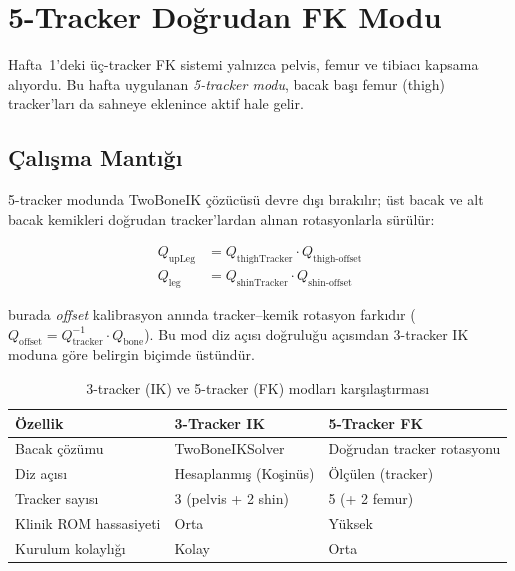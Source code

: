 \documentclass[11pt,a4paper]{article}
\begin{document}
\section{5-Tracker Do\u{g}rudan FK Modu}
\label{sec:fivtracker}

Hafta~1'deki \"u\c{c}-tracker FK sistemi yaln{\i}zca pelvis,
femur ve tibiac{\i} kapsama al{\i}yordu. Bu hafta uygulanan
\textit{5-tracker modu}, bacak ba\c{s}{\i} femur (thigh) tracker'lar{\i}
da sahneye eklenince aktif hale gelir.

\subsection{\c{C}al{\i}\c{s}ma Mant{\i}\u{g}{\i}}

5-tracker modunda TwoBoneIK \c{c}\"oz\"uc\"us\"u devre d{\i}\c{s}{\i}
b{\i}rak{\i}l{\i}r; \"ust bacak ve alt bacak kemikleri do\u{g}rudan
tracker'lardan al{\i}nan rotasyonlarla s\"ur\"ul\"ur:

\begin{align}
    Q_{\text{upLeg}} &= Q_{\text{thighTracker}} \cdot Q_{\text{thigh-offset}}
    \label{eq:fk5_upleg} \\
    Q_{\text{leg}}   &= Q_{\text{shinTracker}}  \cdot Q_{\text{shin-offset}}
    \label{eq:fk5_leg}
\end{align}

burada \textit{offset} kalibrasyon an{\i}nda tracker--kemik
rotasyon fark{\i}d{\i}r ($Q_{\text{offset}} = Q_{\text{tracker}}^{-1}
\cdot Q_{\text{bone}}$). Bu mod diz a\c{c}{\i}s{\i} do\u{g}rulu\u{g}u
a\c{c}{\i}s{\i}ndan 3-tracker IK moduna g\"ore belirgin biçimde
\"ust\"und\"ur.

\begin{table}[H]
\centering
\caption{3-tracker (IK) ve 5-tracker (FK) modlar{\i} kar\c{s}{\i}la\c{s}t{\i}rmas{\i}}
\label{tab:trackermod}
\renewcommand{\arraystretch}{1.25}
\begin{tabular}{lll}
\toprule
\textbf{\"Ozellik} & \textbf{3-Tracker IK} & \textbf{5-Tracker FK} \\
\midrule
Bacak \c{c}\"oz\"umu & TwoBoneIKSolver & Do\u{g}rudan tracker rotasyonu \\
Diz a\c{c}{\i}s{\i} & Hesaplanm{\i}\c{s} (Ko\c{s}in\"us) & \"{O}l\c{c}\"ulen (tracker) \\
Tracker say{\i}s{\i} & 3 (pelvis + 2 shin) & 5 (+ 2 femur) \\
Klinik ROM hassasiyeti & Orta & Y\"uksek \\
Kurulum kolayl{\i}\u{g}{\i} & Kolay & Orta \\
\bottomrule
\end{tabular}
\end{table}
\end{document}

